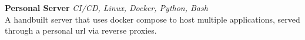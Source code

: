 {\textbf{Personal Server}} {\sl CI/CD, Linux, Docker, Python, Bash} \\
A handbuilt server that uses docker compose to host multiple applications, served through a personal url via reverse proxies.\\
\vspace*{2mm}


